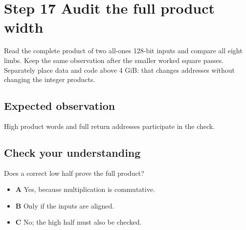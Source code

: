 \section{Step 17 Audit the full product width}\label{rsa-s17}

Read the complete product of two all-ones 128-bit inputs and compare all eight limbs. Keep the same observation after the smaller worked square passes. Separately place data and code above 4 GiB: that changes addresses without changing the integer products.

\subsection{Expected observation}
High product words and full return addresses participate in the check.

\subsection{Check your understanding}
Does a correct low half prove the full product?

\begin{itemize}
  \item \textbf{A} Yes, because multiplication is commutative.
  \item \textbf{B} Only if the inputs are aligned.
  \item \textbf{C} No; the high half must also be checked.
\end{itemize}

